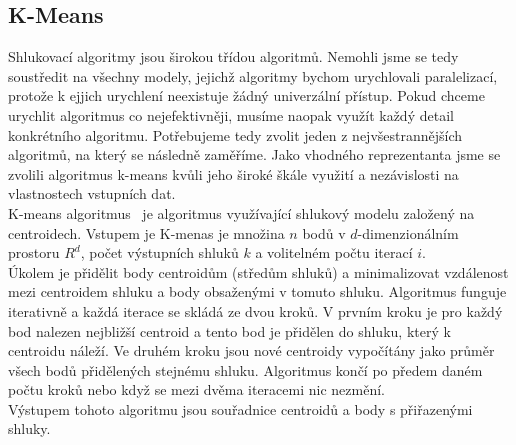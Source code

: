 \subsection{K-Means} 
Shlukovací algoritmy jsou širokou třídou algoritmů. Nemohli jsme se tedy soustředit na všechny modely, jejichž algoritmy bychom urychlovali paralelizací, protože k ejjich urychlení neexistuje žádný univerzální přístup. Pokud chceme urychlit algoritmus co nejefektivněji, musíme naopak využít každý detail konkrétního algoritmu. Potřebujeme tedy zvolit jeden z nejvšestrannějších algoritmů, na který se následně zaměříme. Jako vhodného reprezentanta jsme se zvolili algoritmus k-means kvůli jeho široké škále využití a nezávislosti na vlastnostech vstupních dat. \\
K-means algoritmus~\cite{Aggarwal13, Tan05} je algoritmus využívající shlukový modelu založený na centroidech. Vstupem je K-menas je množina $n$ bodů v $d$-dimenzionálním prostoru $R^d$, počet výstupních shluků $k$ a volitelném počtu iterací $ i $. \\
Úkolem je přidělit body centroidům (středům shluků) a minimalizovat vzdálenost mezi centroidem shluku a body obsaženými v tomuto shluku. Algoritmus funguje iterativně a každá iterace se skládá ze dvou kroků. V prvním kroku je pro každý bod nalezen nejbližší centroid a tento bod je přidělen do shluku, který k centroidu náleží. Ve druhém kroku jsou nové centroidy vypočítány jako průměr všech bodů přidělených stejnému shluku. Algoritmus končí po předem daném počtu kroků nebo když se mezi dvěma iteracemi nic nezmění. \\
Výstupem tohoto algoritmu jsou souřadnice centroidů a body s přiřazenými shluky.



